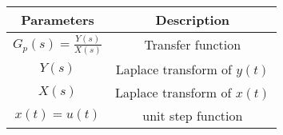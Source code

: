 \begin{tabular}{|c|c|}
\hline
     \textbf{Parameters}&\textbf{Description}  \\
     \hline
     $G_p(s) = \frac{Y(s)}{X(s)}$ & Transfer function\\
     \hline
     $Y(s)$ & Laplace transform of $y(t)$ \\
     \hline
     $X(s)$ & Laplace transform of $x(t)$ \\
     \hline
     $x(t) = u(t)$ & unit step function\\
     \hline
\end{tabular}

